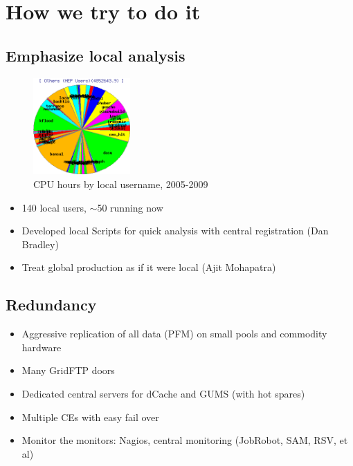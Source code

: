 \documentclass{beamer}
\newcommand{\ca}{\ensuremath{\sim}}
\begin{document}
\section{How we try to do it}
\subsection{Emphasize local analysis}
\begin{frame}
\begin{figure}
    \includegraphics[width=0.33\textwidth]{Graphics/condor-users.png}
    \caption{CPU hours by local username, 2005-2009}
\end{figure}

\begin{itemize}
    \item 140 local users, \ca{}50 running now
    \item Developed local Scripts for quick analysis with central registration (Dan Bradley)
    \item Treat global production as if it were local (Ajit Mohapatra)
\end{itemize}
\end{frame}

\subsection{Redundancy}
\begin{frame}
\begin{itemize}
    \item Aggressive replication of all data (PFM) on small pools and commodity hardware
    \item Many GridFTP doors
    \item Dedicated central servers for dCache and GUMS (with hot spares)
    \item Multiple CEs with easy fail over
    \item Monitor the monitors: Nagios, central monitoring (JobRobot, SAM, RSV, et al)
\end{itemize}
\end{frame}
\end{document}

